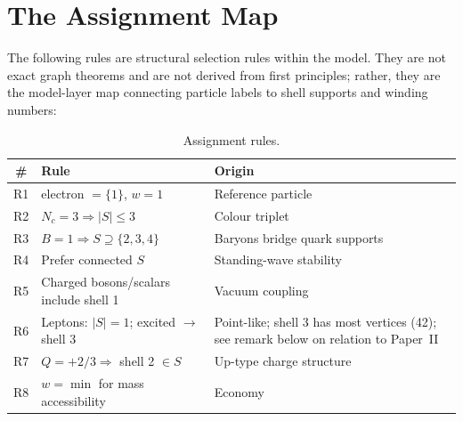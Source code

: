 \documentclass[12pt]{article}
\begin{document}
\section{The Assignment Map}\label{sec:assignments}

The following rules are structural selection rules within the model. They are not exact graph theorems and are not derived from first principles; rather, they are the model-layer map connecting particle labels to shell supports and winding numbers:

\begin{table}[ht]
\centering
\caption{Assignment rules.}
\label{tab:rules}
\begin{tabular}{@{}cll@{}}
\toprule
\# & Rule & Origin \\
\midrule
R1 & electron $= \{1\}$, $w=1$ & Reference particle \\
R2 & $N_c = 3 \Rightarrow |S| \leq 3$ & Colour triplet \\
R3 & $B = 1 \Rightarrow S \supseteq \{2,3,4\}$ & Baryons bridge quark supports \\
R4 & Prefer connected $S$ & Standing-wave stability \\
R5 & Charged bosons/scalars include shell 1 & Vacuum coupling \\
R6 & Leptons: $|S|=1$; excited $\to$ shell 3 & Point-like; shell 3 has most vertices (42); see remark below on relation to Paper~II \\
R7 & $Q = +2/3 \Rightarrow$ shell 2 $\in S$ & Up-type charge structure \\
R8 & $w = \min$ for mass accessibility & Economy \\
\bottomrule
\end{tabular}
\end{table}
\end{document}
